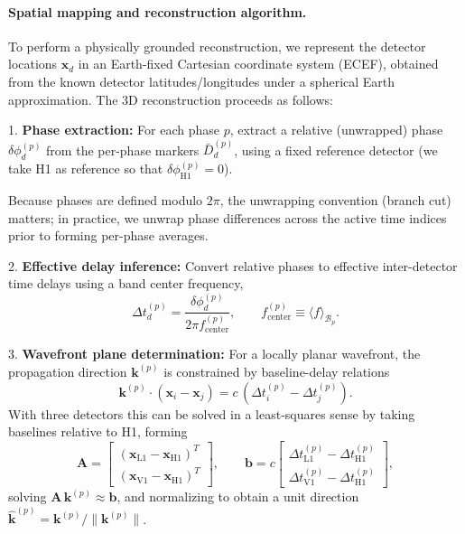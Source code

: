 \documentclass[11pt,a4paper]{article}
\begin{document}
\paragraph{Spatial mapping and reconstruction algorithm.}
To perform a physically grounded reconstruction, we represent the detector locations
$\mathbf{x}_d$ in an Earth-fixed Cartesian coordinate system (ECEF), obtained from the
known detector latitudes/longitudes under a spherical Earth approximation.
The 3D reconstruction proceeds as follows:

1. \textbf{Phase extraction:} For each phase $p$, extract a relative (unwrapped) phase
$\delta \phi_d^{(p)}$ from the per-phase markers $\bar{D}_d^{(p)}$, using a fixed reference detector
(we take H1 as reference so that $\delta\phi_{\mathrm{H1}}^{(p)}=0$).

Because phases are defined modulo $2\pi$, the unwrapping convention (branch cut) matters; in practice,
we unwrap phase differences across the active time indices prior to forming per-phase averages.

2. \textbf{Effective delay inference:} Convert relative phases to effective inter-detector time delays
using a band center frequency,
\begin{equation}
\Delta t_d^{(p)} = \frac{\delta \phi_d^{(p)}}{2\pi f_{\mathrm{center}}^{(p)}},
\qquad
f_{\mathrm{center}}^{(p)}\equiv\langle f\rangle_{\mathcal{B}_p}.
\end{equation}

3. \textbf{Wavefront plane determination:} For a locally planar wavefront, the propagation direction
$\mathbf{k}^{(p)}$ is constrained by baseline-delay relations
\begin{equation}
\mathbf{k}^{(p)} \cdot (\mathbf{x}_i - \mathbf{x}_j) = c \, (\Delta t_i^{(p)} - \Delta t_j^{(p)}).
\end{equation}
With three detectors this can be solved in a least-squares sense by taking baselines relative to H1,
forming
\begin{equation}
\mathbf{A}=
\begin{bmatrix}
(\mathbf{x}_{\mathrm{L1}}-\mathbf{x}_{\mathrm{H1}})^T\\
(\mathbf{x}_{\mathrm{V1}}-\mathbf{x}_{\mathrm{H1}})^T
\end{bmatrix},
\qquad
\mathbf{b}=c
\begin{bmatrix}
\Delta t_{\mathrm{L1}}^{(p)}-\Delta t_{\mathrm{H1}}^{(p)}\\
\Delta t_{\mathrm{V1}}^{(p)}-\Delta t_{\mathrm{H1}}^{(p)}
\end{bmatrix},
\end{equation}
solving $\mathbf{A}\,\mathbf{k}^{(p)}\approx\mathbf{b}$, and normalizing to obtain a unit direction
$\hat{\mathbf{k}}^{(p)}=\mathbf{k}^{(p)}/\|\mathbf{k}^{(p)}\|$.
\end{document}
